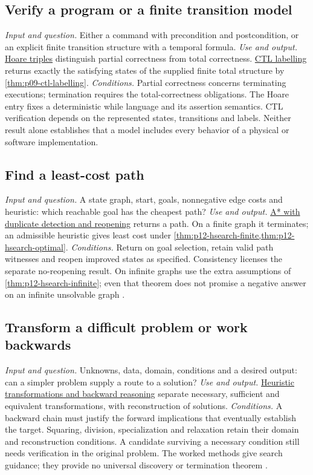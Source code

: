 \subsection{Verify a program or a finite transition model}
\label{sec:p14-finder-verification}
\textit{Input and question.} Either a command with precondition and
postcondition, or an explicit finite transition structure with a temporal
formula.
\textit{Use and output.}
\hyperref[def:p09-hoare-triple]{Hoare triples} distinguish partial correctness
from total correctness. \hyperref[def:p09-ctl-labelling]{CTL labelling}
returns exactly the satisfying states of the supplied finite total structure
by \cref{thm:p09-ctl-labelling}.
\textit{Conditions.} Partial correctness concerns terminating executions;
termination requires the total-correctness obligations. The Hoare entry fixes
a deterministic while language and its assertion semantics. CTL verification
depends on the represented states, transitions and labels. Neither result
alone establishes that a model includes every behavior of a physical or
software implementation.

\subsection{Find a least-cost path}
\label{sec:p14-finder-path}
\textit{Input and question.} A state graph, start, goals, nonnegative edge
costs and heuristic: which reachable goal has the cheapest path?
\textit{Use and output.}
\hyperref[def:p12-hsearch-algorithm]{A* with duplicate detection and reopening}
returns a path. On a finite graph it terminates; an admissible heuristic
gives least cost under \cref{thm:p12-hsearch-finite,thm:p12-hsearch-optimal}.
\textit{Conditions.} Return on goal selection, retain valid path witnesses
and reopen improved states as specified. Consistency licenses the separate
no-reopening result. On infinite graphs use the extra assumptions of
\cref{thm:p12-hsearch-infinite}; even that theorem does not promise a negative
answer on an infinite unsolvable graph
\cite{DechterPearl1985BestFirst}.

\subsection{Transform a difficult problem or work backwards}
\label{sec:p14-finder-backward}
\textit{Input and question.} Unknowns, data, domain, conditions and a desired
output: can a simpler problem supply a route to a solution?
\textit{Use and output.}
\hyperref[sec:p12-heuristic-transformations-and-backward-reasoning]{Heuristic
transformations and backward reasoning} separate necessary, sufficient and
equivalent transformations, with reconstruction of solutions.
\textit{Conditions.} A backward chain must justify the forward implications
that eventually establish the target. Squaring, division, specialization and
relaxation retain their domain and reconstruction conditions. A candidate
surviving a necessary condition still needs verification in the original
problem. The worked methods give search guidance; they provide no universal
discovery or termination theorem
\cite{Polya2004HowToSolveItSelected}.

